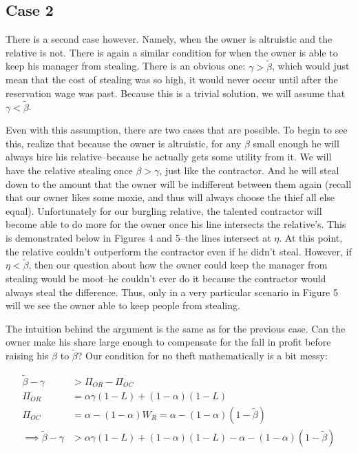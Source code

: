 \documentclass[12pt]{paper}
\begin{document}
\subsection{Case 2} There is a second case however. Namely, when the owner is altruistic and the relative is not. There is again a similar condition for when the owner is able to keep his manager from stealing. There is an obvious one: $\gamma > \tilde{\beta}$, which would just mean that the cost of stealing was so high, it would never occur until after the reservation wage was past. Because this is a trivial solution, we will assume that $\gamma < \tilde{\beta}$.

Even with this assumption, there are two cases that are possible. To begin to see this, realize that because the owner is altruistic, for any $\beta$ small enough he will always hire his relative--because he actually gets some utility from it. We will have the relative stealing once $\beta>\gamma$, just like the contractor. And he will steal down to the amount that the owner will be indifferent between them again (recall that our owner likes some moxie, and thus will always choose the thief all else equal). Unfortunately for our burgling relative, the talented contractor will become able to do more for the owner once his line intersects the relative's. This is demonstrated below in Figures 4 and 5--the lines intersect at $\eta$. At this point, the relative couldn't outperform the contractor even if he didn't steal. However, if $\eta<\tilde{\beta}$, then our question about how the owner could keep the manager from stealing would be moot--he couldn't ever do it because the contractor would always steal the difference. Thus, only in a very particular scenario in Figure 5 will we see the owner able to keep people from stealing.

The intuition behind the argument is the same as for the previous case. Can the owner make his share large enough to compensate for the fall in profit before raising his $\beta$ to $\tilde{\beta}$? Our condition for no theft mathematically is a bit messy:

\begin{align*}
\tilde{\beta}-\gamma&>\Pi_{OR}-\Pi_{OC}\\
\Pi_{OR}&=\alpha \gamma(1-L)+(1-\alpha)(1-L)\\
\Pi_{OC}&=\alpha-(1-\alpha)W_R=\alpha-(1-\alpha)(1-\tilde{\beta})\\
\implies \tilde{\beta}-\gamma&>\alpha \gamma(1-L)+(1-\alpha)(1-L)-\alpha-(1-\alpha)(1-\tilde{\beta})
\end{align*}
\end{document}
